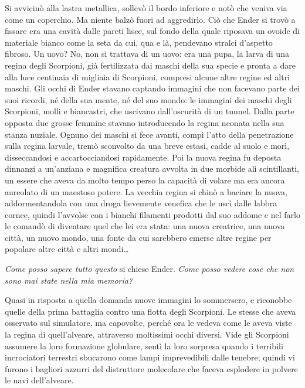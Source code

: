 {Si avvicinò alla lastra metallica, sollevò il bordo inferiore e notò
	che veniva via come un coperchio. Ma niente balzò fuori ad aggredirlo.
	Ciò che Ender si trovò a fissare era una cavità dalle pareti lisce, sul
	fondo della quale riposava un ovoide di materiale bianco come la seta da
	cui, qua e là, pendevano stralci d'aspetto fibroso. Un uovo? No, non si
	trattava di un uovo: era una pupa, la larva di una regina degli
	Scorpioni, già fertilizzata dai maschi della sua specie e pronta a dare
	alla luce centinaia di migliaia di Scorpioni, compresi alcune altre
	regine ed altri maschi. Gli occhi di Ender stavano captando immagini che
	non facevano parte dei suoi ricordi, né della sua mente, né del suo
	mondo: le immagini dei maschi degli Scorpioni, molli e biancastri, che
	uscivano dall'oscurità di un tunnel. Dalla parte opposta due grosse
	femmine stavano introducendo la regina neonata nella sua stanza nuziale.
	Ognuno dei maschi si fece avanti, compì l'atto della penetrazione sulla
	regina larvale, tremò sconvolto da una breve estasi, cadde al suolo e
	morì, disseccandosi e accartocciandosi rapidamente. Poi la nuova regina
	fu deposta dinnanzi a un'anziana e magnifica creatura avvolta in due
	morbide ali scintillanti, un essere che aveva da molto tempo perso la
	capacità di volare ma era ancora aureolato di un maestoso potere. La
	vecchia regina si chinò a baciare la nuova, addormentandola con una
	droga lievemente venefica che le uscì dalle labbra cornee, quindi
	l'avvolse con i bianchi filamenti prodotti dal suo addome e nel farlo le
	comandò di diventare quel che lei era stata: una nuova creatrice, una
	nuova città, un nuovo mondo, una fonte da cui sarebbero emerse altre
	regine per popolare altre città e altri mondi\ldots{}}

\emph{{Come posso sapere tutto questo }}{si chiese Ender. \emph{Come
		posso vedere cose che non sono mai state nella mia memoria?}}

{Quasi in risposta a quella domanda nuove immagini lo sommersero, e
	riconobbe quelle della prima battaglia contro una flotta degli
	Scorpioni. Le stesse che aveva osservato sul simulatore, ma capovolte,
	perché ora le vedeva come le aveva viste la regina di quell'alveare,
	attraverso moltissimi occhi diversi. Vide gli Scorpioni assumere la loro
	formazione globulare, sentì la loro sorpresa quando i terribili
	incrociatori terrestri sbucarono come lampi imprevedibili dalle tenebre;
	quindi vi furono i bagliori azzurri del distruttore molecolare che
	faceva esplodere in polvere le navi dell'alveare.}

